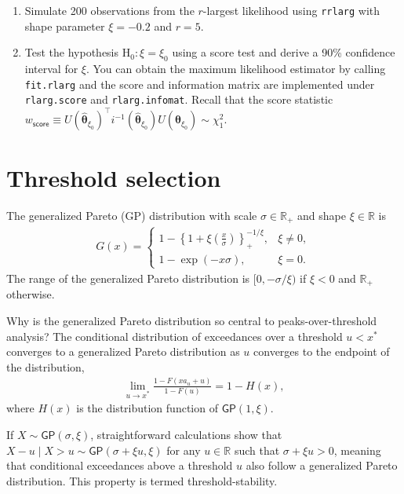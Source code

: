 \documentclass[]{book}
\providecommand{\tightlist}{%
  \setlength{\itemsep}{0pt}\setlength{\parskip}{0pt}}
\begin{document}
\begin{enumerate}
\def\labelenumi{\arabic{enumi}.}
\tightlist
\item
  Simulate 200 observations from the \(r\)-largest likelihood using \texttt{rrlarg} with shape parameter \(\xi=-0.2\) and \(r=5\).
\item
  Test the hypothesis \(\mathrm{H}_0: \xi = \xi_0\) using a score test and derive a 90\% confidence interval for \(\xi\). You can obtain the maximum likelihood estimator by calling \texttt{fit.rlarg} and the score and information matrix are implemented under \texttt{rlarg.score} and \texttt{rlarg.infomat}. Recall that the score statistic \(w_{\mathsf{score}} \equiv U(\hat{\boldsymbol{\theta}}_{\xi_0})^\top i^{-1}(\hat{\boldsymbol{\theta}}_{\xi_0})U( \hat{\boldsymbol{\theta}}_{\xi_0}) \sim \chi^2_1.\)
\end{enumerate}

\hypertarget{threshold-selection}{%
\chapter{Threshold selection}\label{threshold-selection}}

The generalized Pareto (GP) distribution with scale \(\sigma \in \mathbb{R}_{+}\) and shape \(\xi \in \mathbb{R}\) is
\begin{align*}
  G(x)  = \begin{cases}
1-\left\{1+\xi \left(\frac{x}{\sigma}\right)\right\}_{+}^{-1/\xi}, &  \xi \neq 0,
\\ 1-\exp \left(-{x}{\sigma}\right),&  \xi = 0.
\end{cases}
 \end{align*}
The range of the generalized Pareto distribution is \([0, -\sigma/\xi)\) if \(\xi < 0\) and \(\mathbb{R}_{+}\) otherwise.

Why is the generalized Pareto distribution so central to peaks-over-threshold analysis? The conditional distribution of exceedances over a threshold \(u < x^*\) converges to a generalized Pareto distribution as \(u\) converges to the endpoint of the distribution,
\begin{align*}
\lim_{u \to x^*} \frac{1-F(xa_u+u)}{1-F(u)} = 1-H(x),
\end{align*}
where \(H(x)\) is the distribution function of \(\mathsf{GP}(1, \xi)\).

If \(X \sim \mathsf{GP}(\sigma, \xi)\), straightforward calculations show that \(X-u \mid X>u \sim \mathsf{GP}(\sigma + \xi u, \xi)\) for any \(u \in \mathbb{R}\) such that \(\sigma+\xi u>0\), meaning that conditional exceedances above a threshold \(u\) also follow a generalized Pareto distribution. This property is termed threshold-stability.
\end{document}

